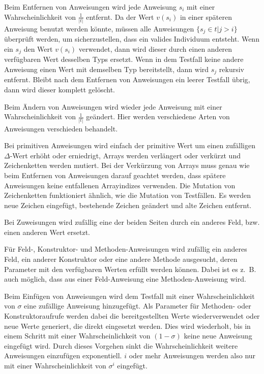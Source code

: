 \documentclass[a4paper,11pt]{article}
\begin{document}
Beim Entfernen von Anweisungen wird jede Anweisung $s_i$ mit einer Wahrscheinlichkeit von $\frac{1}{|t|}$ entfernt.
Da der Wert $v(s_i)$ in einer späteren Anweisung benutzt werden könnte, müssen alle Anweisungen $\{s_j \in t | j > i\}$ überprüft werden, um sicherzustellen, dass ein valides Individuum entsteht.
Wenn ein $s_j$ den Wert $v(s_i)$ verwendet, dann wird dieser durch einen anderen verfügbaren Wert desselben Typs ersetzt.
Wenn in dem Testfall keine andere Anweisung einen Wert mit demselben Typ bereitstellt, dann wird $s_j$ rekursiv entfernt.
Bleibt nach dem Entfernen von Anweisungen ein leerer Testfall übrig, dann wird dieser komplett gelöscht.

Beim Ändern von Anweisungen wird wieder jede Anweisung mit einer Wahrscheinlichkeit von $\frac{1}{|t|}$ geändert.
Hier werden verschiedene Arten von Anweisungen verschieden behandelt.

Bei primitiven Anweisungen wird einfach der primitive Wert um einen zufälligen $\Delta$-Wert erhöht oder erniedrigt, Arrays werden verlängert oder verkürzt und Zeichenketten werden mutiert.
Bei der Verkürzung von Arrays muss genau wie beim Entfernen von Anweisungen darauf geachtet werden, dass spätere Anweisungen keine entfallenen Arrayindizes verwenden.
Die Mutation von Zeichenketten funktioniert ähnlich, wie die Mutation von Testfällen.
Es werden neue Zeichen eingefügt, bestehende Zeichen geändert und alte Zeichen entfernt.

Bei Zuweisungen wird zufällig eine der beiden Seiten durch ein anderes Feld, bzw. einen anderen Wert ersetzt.

Für Feld-, Konstruktor- und Methoden-Anweisungen wird zufällig ein anderes Feld, ein anderer Konstruktor oder eine andere Methode ausgesucht, deren Parameter mit den verfügbaren Werten erfüllt werden können.
Dabei ist es z.~B. auch möglich, dass aus einer Feld-Anweisung eine Methoden-Anweisung wird.

Beim Einfügen von Anweisungen wird dem Testfall mit einer Wahrscheinlichkeit von $\sigma$ eine zufällige Anweisung hinzugefügt.
Als Parameter für Methoden- oder Konstruktoraufrufe werden dabei die bereitgestellten Werte wiederverwendet oder neue Werte generiert, die direkt eingesetzt werden.
Dies wird wiederholt, bis in einem Schritt mit einer Wahrscheinlichkeit von $(1 - \sigma)$ keine neue Anweisung eingefügt wird.
Durch dieses Vorgehen sinkt die Wahrscheinlichkeit weitere Anweisungen einzufügen exponentiell.
$i$ oder mehr Anweisungen werden also nur mit einer Wahrscheinlichkeit von $\sigma^i$ eingefügt.
\end{document}
